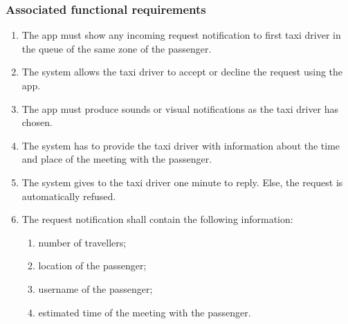 \subsubsection{Associated functional requirements}
\begin{enumerate}
\item The app must show any incoming request notification to first taxi driver in the queue of the same zone of the passenger.
\item The system allows the taxi driver to accept or decline the request using the app.
\item The app must produce sounds or visual notifications as the taxi driver has chosen.
\item The system has to provide the taxi driver with information about the time and place of the meeting with the passenger.
\item The system gives to the taxi driver one minute to reply. Else, the request is automatically refused.
\item The request notification shall contain the following information:
\begin{enumerate}
	\item number of travellers;
	\item location of the passenger;
	\item username of the passenger;
	\item estimated time of the meeting with the passenger.
\end{enumerate}
\end{enumerate}
